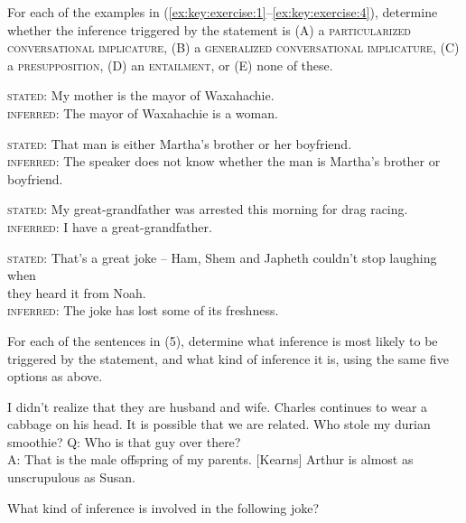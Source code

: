 For each of the examples in (\ref{ex:key:exercise:1}–\ref{ex:key:exercise:4}), determine whether the inference triggered by the statement is \textsc{(A)} a \textsc{particularized conversational implicature}, \textsc{(B)} a \textsc{generalized conversational implicature}, \textsc{(C)} a \textsc{presupposition}, (D) an \textsc{entailment}, or (E) none of these.

 
\ea%
    \label{ex:key:1}




          \textsc{stated}: My mother is the mayor of Waxahachie.\\
\textsc{inferred}: The mayor of Waxahachie is a woman.
    \z 
    
\ea%
    \label{ex:key:2}




          \textsc{stated}: That man is either Martha’s brother or her boyfriend.\\
\textsc{inferred}: The speaker does not know whether the man is Martha’s brother or boyfriend.
    \z
    
\ea%
    \label{ex:key:3}




          \textsc{stated}: My great-grandfather was arrested this morning for drag racing.\\
\textsc{inferred}: I have a great-grandfather.
    \z
    
\ea%
    \label{ex:key:4}




          \textsc{stated}: That’s a great joke – Ham, Shem and Japheth couldn’t stop laughing when\\
  they heard it from Noah.\\
\textsc{inferred}: The joke has lost some of its freshness.
    \z 

For each of the sentences in (5), determine what inference is most likely to be triggered by the statement, and what kind of inference it is, using the same five options as above.

\ea
    \label{ex:key:5}
\ea%
 I didn’t realize that they are husband and wife.
\ex Charles continues to wear a cabbage on his head.
\ex It is possible that we are related.
\ex  Who stole my durian smoothie?
\ex  Q: Who is that guy over there?\\
A: That is the male offspring of my parents.  [Kearns]
\ex  Arthur is almost as unscrupulous as Susan.
\z
\z

What kind of inference is involved in the following joke?



